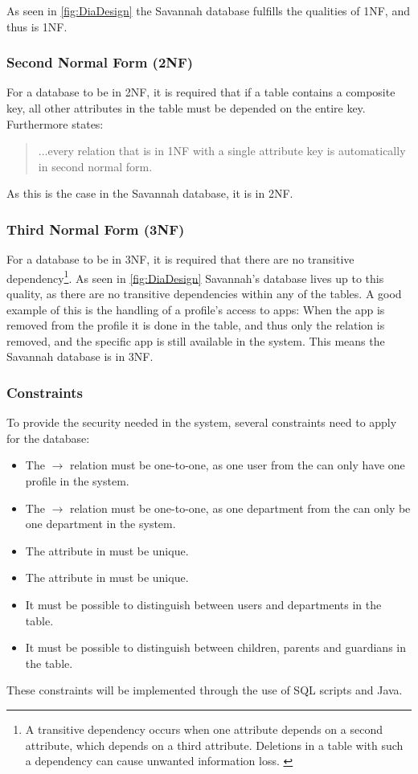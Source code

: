 As seen in \autoref{fig:DiaDesign} the Savannah database fulfills the qualities of 1NF, and thus is 1NF.

\subsubsection{Second Normal Form (2NF)}
For a database to be in 2NF, it is required that if a table contains a composite key, all other attributes in the table must be depended on the entire key.
Furthermore \cite[p. 117]{sqlForDummies} states:
\begin{quotation}
...every
relation that is in 1NF with a single attribute key is automatically in second
normal form.
\end{quotation}
As this is the case in the Savannah database, it is in 2NF.

\subsubsection{Third Normal Form (3NF)}
For a database to be in 3NF, it is required that there are no transitive dependency\footnote{A transitive dependency occurs when one attribute depends on a second
attribute, which depends on a third attribute. Deletions in a table with such a
dependency can cause unwanted information loss. \cite[p. 118]{sqlForDummies}}.
As seen in \autoref{fig:DiaDesign} Savannah's database lives up to this quality, as there are no transitive dependencies within any of the tables. A good example of this is the handling of a profile's access to apps: When the app is removed from the profile it is done in the  table, and thus only the relation is removed, and the specific app is still available in the system. This means the Savannah database is in 3NF.

\subsubsection*{Constraints}
\label{databaseRules}
To provide the security needed in the system, several constraints need to apply for the database:
\begin{itemize}
	\item The $\rightarrow$ relation must be one-to-one, as one user from the  can only have one profile in the system.
	\item The $\rightarrow$ relation must be one-to-one, as one department from the  can only be one department in the system.
	\item The  attribute in  must be unique.
	\item The  attribute in  must be unique.
	\item It must be possible to distinguish between users and departments in the  table.
	\item It must be possible to distinguish between children, parents and guardians in the  table.
\end{itemize}

These constraints will be implemented through the use of SQL scripts and Java.
